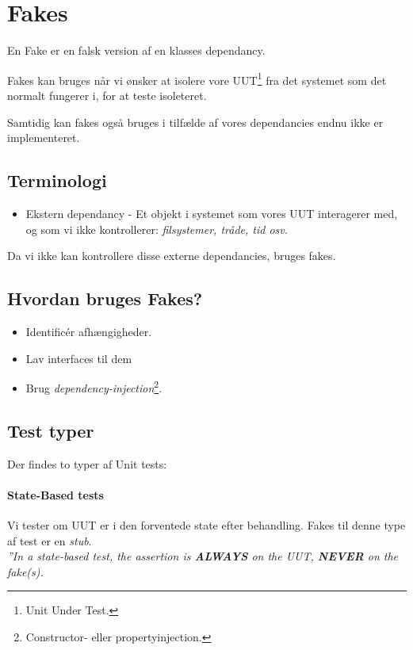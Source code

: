 \section{Fakes}

En Fake er en falsk version af en klasses dependancy.

Fakes kan bruges når vi ønsker at isolere vore UUT\footnote{Unit Under Test.} fra det systemet som det normalt fungerer i, for at teste isoleteret.

Samtidig kan fakes også bruges i tilfælde af vores dependancies endnu ikke er implementeret.

\subsection{Terminologi}
\begin{itemize}
	\item Ekstern dependancy - Et objekt i systemet som vores UUT interagerer med, og som vi ikke kontrollerer: \textit{filsystemer, tråde, tid osv.}
\end{itemize}

Da vi ikke kan kontrollere disse externe dependancies, bruges fakes.

\subsection{Hvordan bruges Fakes?}

\begin{itemize}
	\item Identificér afhængigheder.
	\item Lav interfaces til dem
	\item Brug \textit{dependency-injection}\footnote{Constructor- eller propertyinjection.}.
\end{itemize}

\subsection{Test typer}
Der findes to typer af Unit tests:

\paragraph{State-Based tests} Vi tester om UUT er i den forventede state efter behandling. Fakes til denne type af test er en \textit{stub}. \\

\textit{''In a state-based test, the assertion is \textbf{ALWAYS} on the UUT, \textbf{NEVER} on the fake(s).}

